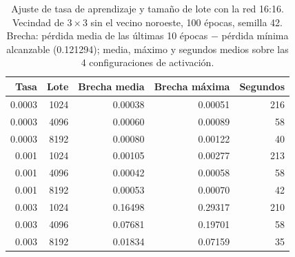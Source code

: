 \begin{table}[H]
	\centering
	\small
	\begin{tabular}{rrrrr}
		\toprule
		\textbf{Tasa} & \textbf{Lote} & \textbf{Brecha media} & \textbf{Brecha máxima} & \textbf{Segundos} \\
		\midrule
		0.0003 & 1024 & 0.00038 & 0.00051 & 216 \\
		0.0003 & 4096 & 0.00060 & 0.00089 & 58 \\
		0.0003 & 8192 & 0.00080 & 0.00122 & 40 \\
		\midrule
		0.001 & 1024 & 0.00105 & 0.00277 & 213 \\
		0.001 & 4096 & 0.00042 & 0.00058 & 58 \\
		0.001 & 8192 & 0.00053 & 0.00070 & 42 \\
		\midrule
		0.003 & 1024 & 0.16498 & 0.29317 & 210 \\
		0.003 & 4096 & 0.07681 & 0.19701 & 58 \\
		0.003 & 8192 & 0.01834 & 0.07159 & 35 \\
		\bottomrule
	\end{tabular}
	\caption{Ajuste de tasa de aprendizaje y tamaño de lote con la red 16:16. Vecindad de $3\times3$ sin el vecino noroeste, 100 épocas, semilla 42. Brecha: pérdida media de las últimas 10 épocas $-$ pérdida mínima alcanzable (0.121294); media, máximo y segundos medios sobre las 4 configuraciones de activación.}
	\label{tab:vecindad_ajuste_16x16}
\end{table}
